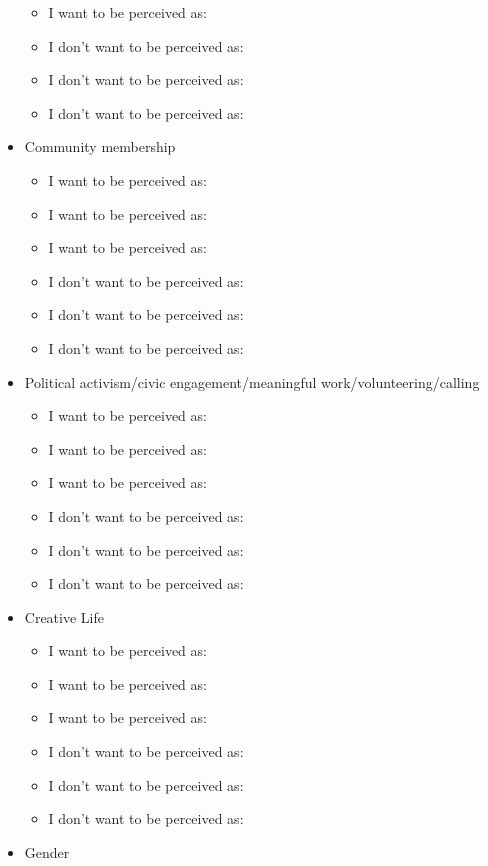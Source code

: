 \documentclass[12pt,letterpaper]{article}
\begin{document}
\begin{itemize}
\begin{itemize}
        \item I want to be perceived as:
        \item I don't want to be perceived as:
        \item I don't want to be perceived as:
        \item I don't want to be perceived as:
    \end{itemize}
    \item Community membership
    \begin{itemize}
        \item I want to be perceived as:
        \item I want to be perceived as:
        \item I want to be perceived as:
        \item I don't want to be perceived as:
        \item I don't want to be perceived as:
        \item I don't want to be perceived as:
    \end{itemize}
    \item Political activism/civic engagement/meaningful work/volunteering/calling
    \begin{itemize}
        \item I want to be perceived as:
        \item I want to be perceived as:
        \item I want to be perceived as:
        \item I don't want to be perceived as:
        \item I don't want to be perceived as:
        \item I don't want to be perceived as:
    \end{itemize}
    \item Creative Life
    \begin{itemize}
        \item I want to be perceived as:
        \item I want to be perceived as:
        \item I want to be perceived as:
        \item I don't want to be perceived as:
        \item I don't want to be perceived as:
        \item I don't want to be perceived as:
    \end{itemize}
    \item Gender
    \begin{itemize}

\end{itemize}
\end{itemize}
\end{document}
